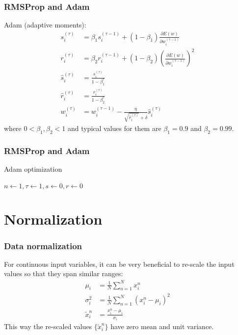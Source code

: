 \documentclass{beamer}
\begin{document}
\begin{frame}
    \frametitle{RMSProp and Adam}
    Adam (adaptive moments):
    \begin{align*}
        s^{(\tau)}_{i}&=\beta_{1}s^{(\tau-1)}_{i}+(1-\beta_{1})\frac{\partial{}E(w)}{\partial{}w^{(\tau-1)}_{i}} \\
        r^{(\tau)}_{i}&=\beta_{2}r^{(\tau-1)}_{i}+(1-\beta_{2})(\frac{\partial{}E(w)}{\partial{}w^{(\tau-1)}_{i}})^{2} \\
        \hat{s}^{(\tau)}_{i}&=\frac{s^{(\tau)}_{i}}{1-\beta_{1}^{\tau}} \\
        \hat{r}^{(\tau)}_{i}&=\frac{r^{(\tau)}_{i}}{1-\beta_{2}^{\tau}} \\
        w^{(\tau)}_{i}&=w^{(\tau-1)}_{i}-\frac{\eta}{\sqrt{\hat{r}^{(\tau)}_{i}}+\delta}\hat{s}^{(\tau)}_{i}
    \end{align*}
    where $0<\beta_{1},\beta_{2}<1$ and typical values for them are $\beta_{1}=0.9$ and $\beta_{2}=0.99$.
\end{frame}

\begin{frame}
    \frametitle{RMSProp and Adam}
    \begin{algorithm}[H]
        \caption{Adam optimization}
        $n\gets{}1,\tau\gets{}1,s\gets{}0,r\gets{}0$\;
        \;
    \end{algorithm}
\end{frame}

\section{Normalization}

\begin{frame}
    \frametitle{Data normalization}
    For continuous input variables, it can be very beneficial to re-scale the input values so that they span similar ranges:
    \begin{align*}
        \mu_{i}&=\frac{1}{N}\sum_{n=1}^{N}x^{n}_{i} \\
        \sigma^{2}_{i}&=\frac{1}{N}\sum_{n=1}^{N}(x^{n}_{i}-\mu_{i})^{2} \\
        \tilde{x}^{n}_{i}&=\frac{x^{n}_{i}-\mu_{i}}{\sigma_{i}}
    \end{align*}
    This way the re-scaled values $\{\tilde{x}^{n}_{i}\}$ have zero mean and unit variance.
\end{frame}
\end{document}

